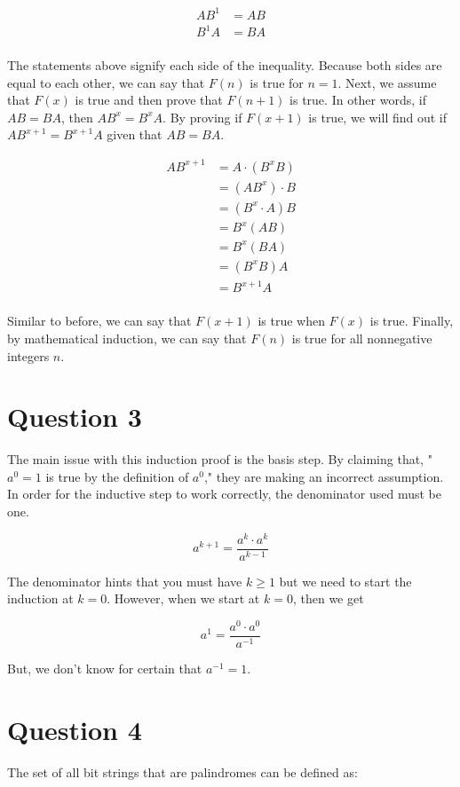 \documentclass[11pt]{article}
\begin{document}
\begin{align*}
    AB^1 &= AB\\
    B^1A &= BA\\
\end{align*}

The statements above signify each side of the inequality. Because both sides are equal to each other, we can say that $F(n)$ is true for $n = 1$. Next, we assume that $F(x)$ is true and then prove that $F(n + 1)$ is true. In other words, if $AB = BA$, then $AB^x = B^xA$. By proving if $F(x + 1)$ is true, we will find out if $AB^{x + 1} = B^{x + 1}A$ given that $AB = BA$.

\begin{align*}
    AB^{x + 1} &= A \cdot (B^xB)\\
    &= (AB^x) \cdot B\\
    &= (B^x \cdot A)B\\
    &= B^x(AB)\\
    &= B^x(BA)\\
    &= (B^xB)A\\
    &= B^{x + 1}A\\
\end{align*}

Similar to before, we can say that $F(x + 1)$ is true when $F(x)$ is true. Finally, by mathematical induction, we can say that $F(n)$ is true for all nonnegative integers $n$.

\section*{Question 3}
The main issue with this induction proof is the basis step. By claiming that, "$a^0 = 1$ is true by the definition of $a^0$," they are making an incorrect assumption. In order for the inductive step to work correctly, the denominator used must be one.

\[a^{k + 1} = \frac{a^k \cdot a^k}{a^{k - 1}}\]

The denominator hints that you must have $k \geq 1$ but we need to start the induction at $k = 0$. However, when we start at $k = 0$, then we get

\[a^1 = \frac{a^0 \cdot a^0}{a^{-1}}\]

But, we don't know for certain that $a^{-1} = 1$.

\section*{Question 4}
The set of all bit strings that are palindromes can be defined as:
\end{document}
